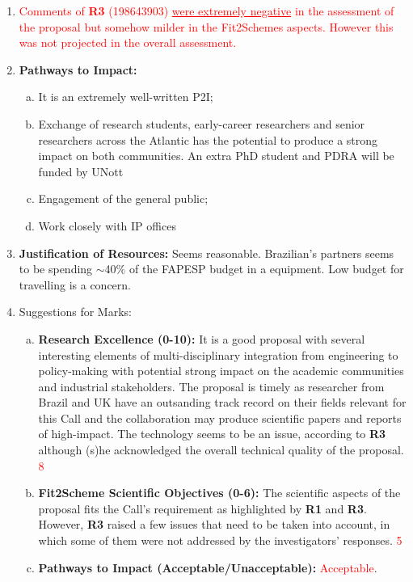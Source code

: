 \documentclass[14pt,twoside]{report}
\begin{document}
       \begin{enumerate}[1.]
          \item \textcolor{red}{Comments of {\bf R3} (198643903) \underline{were extremely negative} in the assessment of the proposal but somehow milder in the Fit2Schemes aspects. However this was not projected in the overall assessment.}
          \item {\bf Pathways to Impact:}
              \begin{enumerate}[(a)]
                 \item It is an extremely well-written P2I;
                 \item Exchange of research students, early-career researchers and senior researchers across the Atlantic has the potential to produce a strong impact on both communities. An extra PhD student and PDRA will be funded by UNott
                 \item Engagement of the general public;
                 \item Work closely with IP offices
              \end{enumerate}
%
          \item {\bf Justification of Resources:} Seems reasonable. Brazilian's partners seems to be spending $\sim$40$\%$ of the FAPESP budget in a equipment. Low budget for travelling is a concern.
%       
          \item Suggestions for  Marks:
              \begin{enumerate}[(a)]
                 \item {\bf Research Excellence (0-10):} It is a good proposal with several interesting elements of multi-disciplinary integration from engineering to policy-making with potential strong impact on the academic communities and industrial stakeholders. The proposal is timely as researcher from Brazil and UK have an outsanding track record on their fields relevant for this Call and the collaboration may produce scientific papers and reports of high-impact. The technology seems to be an issue, according to {\bf R3} although (s)he acknowledged the overall technical quality of the proposal. \textcolor{red}{8}
                 \item {\bf Fit2Scheme Scientific Objectives (0-6):} The scientific aspects of the proposal fits the Call's requirement as highlighted by {\bf R1} and {\bf R3}. However, {\bf R3} raised a few issues that need to be taken into account, in which some of them were not addressed by the investigators' responses. \textcolor{red}{5}
                 \item {\bf Pathways to Impact (Acceptable/Unacceptable):} \textcolor{red}{Acceptable}.
              \end{enumerate}
%
       \end{enumerate}
\end{document}
